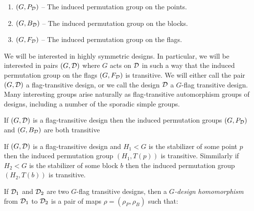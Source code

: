 \begin{enumerate}
\item $(G, P_{\mathcal{D}})$ -- The induced permutation group on the points.
\item $(G, B_{\mathcal{D}})$ -- The induced permutation group on the blocks.
\item $(G, F_{\mathcal{D}})$ -- The induced permutation group on the flags.
\end{enumerate}


We will be interested in highly symmetric designs.
In particular, we will be interested in pairs $(G, \mathcal{D})$
where $G$ acts on $\mathcal{D}$ in such a way that the induced
permutation group on the flags $(G, F_{\mathcal{D}})$ is transitive.
We will either call the pair $(G, \mathcal{D})$ a flag-transitive design,
or we call the design $\mathcal{D}$ a $G$-flag transitive design.
Many interesting groups arise naturally as flag-transitive
automorphism groups of designs, including a number
of the sporadic simple groups.

\begin{proposition}
If $(G,\mathcal{D})$ is a flag-transitive design
then the induced permutation groups $(G,P_{\mathcal{D}})$ and $(G,B_{\mathcal{D}})$
are both transitive
\end{proposition}


\begin{proposition}
If $(G,\mathcal{D})$ is a flag-transitive design and $H_1 < G$
is the stabilizer of some point $p$ then the
induced permutation group $(H_1, T(p))$ is transitive.
Simmilarly if $H_2 < G$ is the stabilizer of some block $b$
then the induced permutation group $(H_2, T(b))$ is transitive.
\end{proposition}


If $\mathcal{D}_1$ and $\mathcal{D}_2$ are two $G$-flag transitive designs, 
then a {\it $G$-design homomorphism} from $\mathcal{D}_1$ to $\mathcal{D}_2$
is a pair of maps $\rho = (\rho_P, \rho_B)$
such that:

